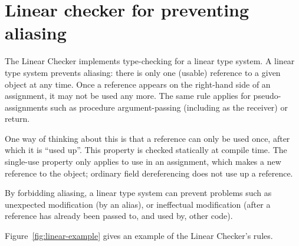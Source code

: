 \htmlhr
\chapter{Linear checker for preventing aliasing\label{linear-checker}}

The Linear Checker implements type-checking for a linear type system.  A
linear type system prevents aliasing:  there is only one (usable) reference
to a given object at any time.  Once a reference appears on the right-hand
side of an assignment, it may not be used any more.  The same rule applies
for pseudo-assignments such as procedure argument-passing (including as the
receiver) or return.

One way of thinking about this is that a reference can only be used once,
after which it is ``used up''.  This property is checked statically at
compile time.  The single-use property only applies to use in an
assignment, which makes a new reference to the object; ordinary field
dereferencing does not use up a reference.

By forbidding aliasing, a linear type system can prevent problems such as
unexpected modification (by an alias), or ineffectual modification (after a
reference has already been passed to, and used by, other code).




Figure~\ref{fig:linear-example} gives an example of the Linear Checker's rules.


